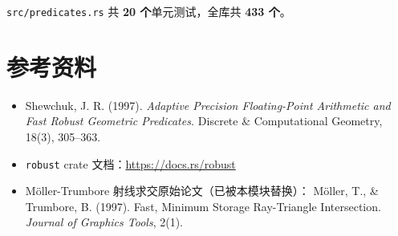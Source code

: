 \documentclass[11pt,a4paper]{article}
\begin{document}
\texttt{src/predicates.rs} 共 \textbf{20 个}单元测试，全库共 \textbf{433 个}。

\section{参考资料}

\begin{itemize}
  \item Shewchuk, J. R. (1997). \textit{Adaptive Precision Floating-Point
        Arithmetic and Fast Robust Geometric Predicates.}
        Discrete \& Computational Geometry, 18(3), 305--363.
  \item \texttt{robust} crate 文档：\url{https://docs.rs/robust}
  \item Möller-Trumbore 射线求交原始论文（已被本模块替换）：
        Möller, T., \& Trumbore, B. (1997). Fast, Minimum Storage
        Ray-Triangle Intersection. \textit{Journal of Graphics Tools}, 2(1).
\end{itemize}
\end{document}
